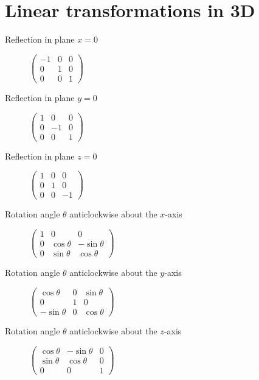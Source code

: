 \section{Linear transformations in 3D}
\begin{description}
	\item[Reflection in plane $x=0$] $\begin{pmatrix}
		-1 & 0 & 0\\
		0 & 1 & 0 \\
		0 & 0 & 1
	\end{pmatrix}$
	\item[Reflection in plane $y=0$] $\begin{pmatrix}
		1 & 0 & 0\\
		0 & -1 & 0 \\
		0 & 0 & 1
	\end{pmatrix}$
	\item[Reflection in plane $z=0$] $\begin{pmatrix}
		1 & 0 & 0\\
		0 & 1 & 0 \\
		0 & 0 & -1
	\end{pmatrix}$
	\item[Rotation angle $\theta$ anticlockwise about the $x$-axis] $\begin{pmatrix}
		1 & 0 & 0\\
		0 & \cos\theta & -\sin\theta \\
		0 & \sin\theta & \cos\theta
	\end{pmatrix}$
	\item[Rotation angle $\theta$ anticlockwise about the $y$-axis] $\begin{pmatrix}
	\cos\theta & 0 & \sin\theta \\
	0 & 1 & 0\\
	-\sin\theta & 0 & \cos\theta
	\end{pmatrix}$
	\item[Rotation angle $\theta$ anticlockwise about the $z$-axis] $\begin{pmatrix}
		\cos\theta & -\sin\theta & 0\\
		\sin\theta & \cos\theta & 0\\
		0 & 0 & 1
	\end{pmatrix}$
\end{description}




